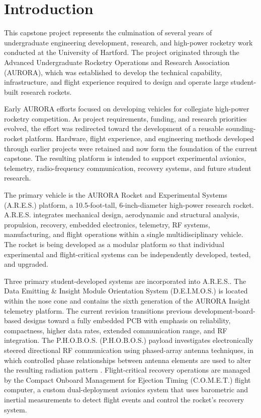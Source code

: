 \documentclass[11pt,twocolumn]{IEEEtran}
\newcommand{\comet}{C.O.M.E.T.}
\newcommand{\ares}{A.R.E.S.}
\newcommand{\phobos}{P.H.O.B.O.S.}
\newcommand{\deimos}{D.E.I.M.O.S.}
\begin{document}
\onecolumn


\tableofcontents

\twocolumn
\newpage

\section{Introduction}

This capstone project represents the culmination of several years of undergraduate engineering development, research, and high-power rocketry work conducted at the University of Hartford. The project originated through the Advanced Undergraduate Rocketry Operations and Research Association (AURORA), which was established to develop the technical capability, infrastructure, and flight experience required to design and operate large student-built research rockets.

Early AURORA efforts focused on developing vehicles for collegiate high-power rocketry competition. As project requirements, funding, and research priorities evolved, the effort was redirected toward the development of a reusable sounding-rocket platform. Hardware, flight experience, and engineering methods developed through earlier projects were retained and now form the foundation of the current capstone. The resulting platform is intended to support experimental avionics, telemetry, radio-frequency communication, recovery systems, and future student research.

The primary vehicle is the AURORA Rocket and Experimental Systems (\ares{}) platform, a 10.5-foot-tall, 6-inch-diameter high-power research rocket. \ares{} integrates mechanical design, aerodynamic and structural analysis, propulsion, recovery, embedded electronics, telemetry, RF systems, manufacturing, and flight operations within a single multidisciplinary vehicle. The rocket is being developed as a modular platform so that individual experimental and flight-critical systems can be independently developed, tested, and upgraded.

Three primary student-developed systems are incorporated into \ares{}. The Data Emitting \& Insight Module Orientation System (\deimos{}) is located within the nose cone and contains the sixth generation of the AURORA Insight telemetry platform. The current revision transitions previous development-board-based designs toward a fully embedded PCB with emphasis on reliability, compactness, higher data rates, extended communication range, and RF integration. The P.H.O.B.O.S. (\phobos{}) payload investigates electronically steered directional RF communication using phased-array antenna techniques, in which controlled phase relationships between antenna elements are used to alter the resulting radiation pattern \cite{balanis}. Flight-critical recovery operations are managed by the Compact Onboard Management for Ejection Timing (\comet{}) flight computer, a custom dual-deployment avionics system that uses barometric and inertial measurements to detect flight events and control the rocket's recovery system.
\end{document}
